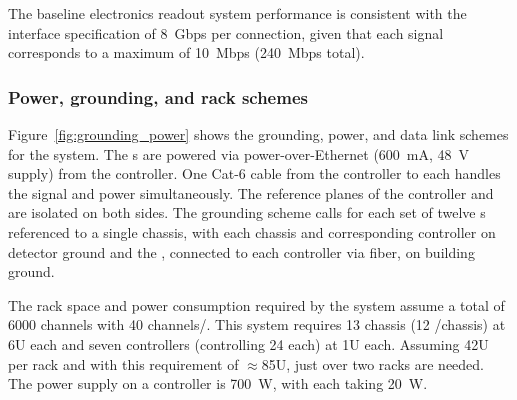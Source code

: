 The baseline electronics readout system performance is consistent with the  interface specification of 8~Gbps per connection, given that  
each  signal corresponds to a maximum of 10~Mbps (240~Mbps total).  



\subsubsection{Power, grounding, and rack schemes} 

Figure~\ref{fig:grounding_power} shows the grounding, power, and data link schemes for the system. The s are powered via power-over-Ethernet (\SI{600}{mA}, \SI{48}{V} supply) from the controller. One Cat-6 cable from the controller to each  handles the signal and power simultaneously. The reference planes of the controller and  are isolated on both sides. The grounding scheme calls for each set of twelve s referenced to a single chassis, with each chassis and corresponding controller on detector ground and the , connected to each controller via fiber, on building ground. 
 
The rack space and power consumption required by the system assume
a total of 6000 channels with 40 channels/. This system requires 13 chassis (12 /chassis) at 6U each and seven controllers (controlling 24  each) at 1U each. Assuming 42U per rack and with this requirement of $\approx$85U, just over two racks are needed. The power supply on a controller is 700~W, with each  taking 20~W. 
 

